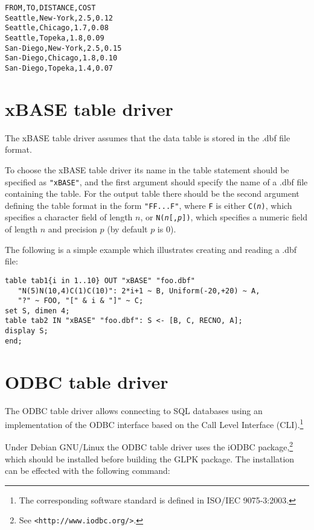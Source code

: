 \documentclass[11pt]{report}
\def\para#1{\noindent{\bf#1}}
\begin{document}
\para{Example}

\begin{verbatim}
FROM,TO,DISTANCE,COST
Seattle,New-York,2.5,0.12
Seattle,Chicago,1.7,0.08
Seattle,Topeka,1.8,0.09
San-Diego,New-York,2.5,0.15
San-Diego,Chicago,1.8,0.10
San-Diego,Topeka,1.4,0.07
\end{verbatim}

\newpage

\section{xBASE table driver}

The xBASE table driver assumes that the data table is stored in the
.dbf file format.

To choose the xBASE table driver its name in the table statement should
be specified as \verb|"xBASE"|, and the first argument should specify
the name of a .dbf file containing the table. For the output table there
should be the second argument defining the table format in the form
\verb|"FF...F"|, where \verb|F| is either {\tt C({\it n})},
which specifies a character field of length $n$, or
{\tt N({\it n}{\rm [},{\it p}{\rm ]})}, which specifies a numeric field
of length $n$ and precision $p$ (by default $p$ is 0).

The following is a simple example which illustrates creating and
reading a .dbf file:

\begin{verbatim}
table tab1{i in 1..10} OUT "xBASE" "foo.dbf"
   "N(5)N(10,4)C(1)C(10)": 2*i+1 ~ B, Uniform(-20,+20) ~ A,
   "?" ~ FOO, "[" & i & "]" ~ C;
set S, dimen 4;
table tab2 IN "xBASE" "foo.dbf": S <- [B, C, RECNO, A];
display S;
end;
\end{verbatim}

\section{ODBC table driver}

The ODBC table driver allows connecting to SQL databases using an
implementation of the ODBC interface based on the Call Level Interface
(CLI).\footnote{The corresponding software standard is defined in
ISO/IEC 9075-3:2003.}

\para{Debian GNU/Linux.}
Under Debian GNU/Linux the ODBC table driver uses the iODBC
package,\footnote{See {\tt<http://www.iodbc.org/>}.} which should be
installed before building the GLPK package. The installation can be
effected with the following command:
\end{document}
